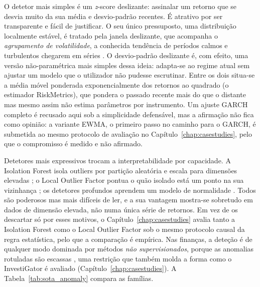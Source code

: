 O detetor mais simples é um \emph{z}-score deslizante: assinalar um retorno que se desvia muito da sua
média e desvio-padrão recentes. É atrativo por ser transparente e fácil de justificar. O seu único
pressuposto, uma distribuição localmente estável, é tratado pela janela deslizante, que acompanha o
\emph{agrupamento de volatilidade}, a conhecida tendência de períodos calmos e turbulentos chegarem em
séries \autocite{engle1982arch, bollerslev1986garch}. O desvio-padrão deslizante é, com efeito, uma versão
não-paramétrica mais simples dessa ideia: adapta-se ao regime atual sem ajustar um modelo que o
utilizador não pudesse escrutinar. Entre os dois situa-se a média móvel ponderada exponencialmente dos
retornos ao quadrado (o estimador RiskMetrics), que pondera o passado recente mais do que o distante mas
mesmo assim não estima parâmetros por instrumento. Um ajuste GARCH completo é recusado aqui sob a
simplicidade defensável, mas a afirmação não fica como opinião: a variante EWMA, o primeiro passo no
caminho para o GARCH, é submetida ao mesmo protocolo de avaliação no
Capítulo~\ref{chap:casestudies}, pelo que o compromisso é medido e não afirmado.

Detetores mais expressivos trocam a interpretabilidade por capacidade. A Isolation Forest isola outliers
por partição aleatória e escala para dimensões elevadas \autocite{liu2008isolation}; o Local Outlier
Factor pontua o quão isolado está um ponto na sua vizinhança \autocite{breunig2000lof}; os detetores
profundos aprendem um modelo de normalidade \autocite{pang2021deep}. Todos são poderosos mas mais difíceis
de ler, e a sua vantagem mostra-se sobretudo em dados de dimensão elevada, não numa única série de
retornos. Em vez de os descartar só por esses motivos, o Capítulo~\ref{chap:casestudies} avalia tanto a
Isolation Forest como o Local Outlier Factor sob o mesmo protocolo causal da regra estatística, pelo que a
comparação é empírica. Nas finanças, a deteção é de qualquer modo dominada por métodos \emph{não
supervisionados}, porque as anomalias rotuladas são escassas \autocite{ahmed2016financial}, uma restrição
que também molda a forma como o InvestiGator é avaliado (Capítulo~\ref{chap:casestudies}). A
Tabela~\ref{tab:sota_anomaly} compara as famílias.

